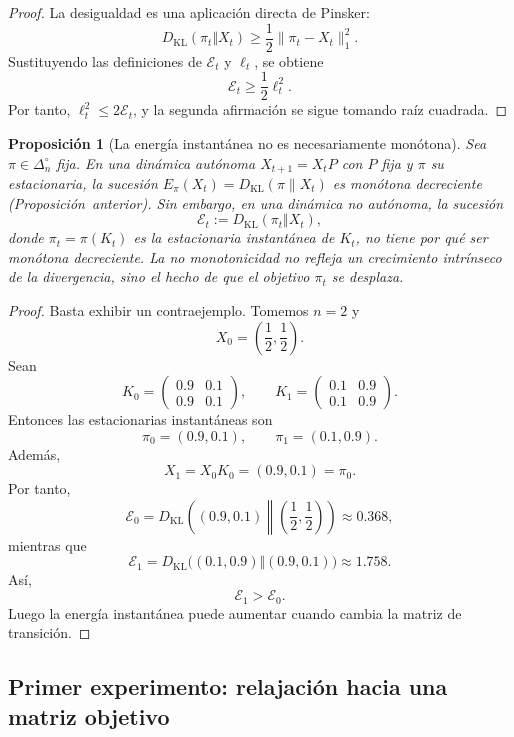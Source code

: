 \documentclass[12pt]{article}
\newtheorem{proposicion}{Proposición}[section]
\begin{document}
\begin{proof}
La desigualdad es una aplicación directa de Pinsker:
\[
D_{\mathrm{KL}}(\pi_t\Vert X_t)
\geq
\frac12\|\pi_t-X_t\|_1^2.
\]
Sustituyendo las definiciones de \(\mathcal E_t\) y \(\ell_t\), se obtiene
\[
\mathcal E_t\geq \frac12\ell_t^2.
\]
Por tanto, \(\ell_t^2\leq 2\mathcal E_t\), y la segunda afirmación se sigue
tomando raíz cuadrada.
\end{proof}

\begin{proposicion}[La energía instantánea no es necesariamente monótona]
Sea $\pi\in\Delta_n^\circ$ fija. En una dinámica autónoma $X_{t+1}=X_tP$
con $P$ fija y $\pi$ su estacionaria, la sucesión $E_\pi(X_t)=D_{\mathrm{KL}}(\pi\|X_t)$
es monótona decreciente (Proposición~anterior). Sin embargo, en una dinámica
no autónoma, la sucesión
\[
\mathcal E_t:=D_{\mathrm{KL}}(\pi_t\Vert X_t),
\]
donde $\pi_t=\pi(K_t)$ es la estacionaria \emph{instantánea} de $K_t$,
no tiene por qué ser monótona decreciente. La no monotonicidad no refleja
un crecimiento intrínseco de la divergencia, sino el hecho de que el
objetivo $\pi_t$ se desplaza.
\end{proposicion}

\begin{proof}
Basta exhibir un contraejemplo. Tomemos \(n=2\) y
\[
X_0=\left(\frac12,\frac12\right).
\]
Sean
\[
K_0=
\begin{pmatrix}
0.9 & 0.1\\
0.9 & 0.1
\end{pmatrix},
\qquad
K_1=
\begin{pmatrix}
0.1 & 0.9\\
0.1 & 0.9
\end{pmatrix}.
\]
Entonces las estacionarias instantáneas son
\[
\pi_0=(0.9,0.1),
\qquad
\pi_1=(0.1,0.9).
\]
Además,
\[
X_1=X_0K_0=(0.9,0.1)=\pi_0.
\]
Por tanto,
\[
\mathcal E_0
=
D_{\mathrm{KL}}\left((0.9,0.1)\middle\Vert
\left(\frac12,\frac12\right)\right)
\approx 0.368,
\]
mientras que
\[
\mathcal E_1
=
D_{\mathrm{KL}}\bigl((0.1,0.9)\Vert(0.9,0.1)\bigr)
\approx 1.758.
\]
Así,
\[
\mathcal E_1>\mathcal E_0.
\]
Luego la energía instantánea puede aumentar cuando cambia la matriz de
transición.
\end{proof}

\subsection{Primer experimento: relajación hacia una matriz objetivo}
\end{document}
